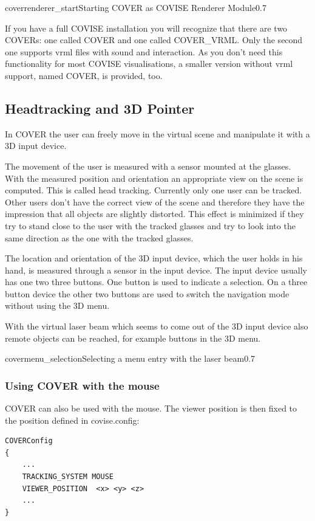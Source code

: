 \begin{covimg}{cover}{renderer_start}{Starting COVER as COVISE Renderer Module}{0.7}\end{covimg}

If you have a full COVISE installation you will recognize that there
are two COVERs: one called COVER and one called COVER\_VRML. Only the
second one supports vrml files with sound and interaction. As you don't
need this functionality for most COVISE visualisations, a smaller 
version without vrml support, named COVER, is provided, too.

\label{label_tracking_3dpointer}
\subsection{Headtracking and 3D Pointer}
In COVER the user can freely move in the virtual scene  
and manipulate it with a 3D input device.

The movement of the user is measured with a sensor 
mounted at the glasses. With the measured position and orientation an 
appropriate view on the scene is computed. This is called head tracking.
Currently only one user can be tracked. Other users don't have the correct 
view of the scene and therefore they have the impression that all objects 
are slightly distorted. This effect is minimized if they try to stand close 
to the user with the tracked glasses and try to look into the same 
direction as the one with the tracked glasses. 

The location and orientation of the 3D input device, which the user
holds in his hand, is measured through a sensor in the input device.
The input device usually has one two three buttons. One button is 
used to indicate a selection. On a three button device the other two buttons
are used to switch the navigation mode without using the 3D menu.

With the virtual laser beam which seems to come out of the 3D input device also
remote objects can be reached, for example buttons in the 3D menu.

\begin{covimg}{cover}{menu_selection}{Selecting a menu entry with the laser beam}{0.7}\end{covimg}

\subsubsection{Using COVER with the mouse}
COVER can also be used with the mouse. The viewer position is then fixed to
the position defined in covise.config:
\begin{samepage}
\begin{verbatim}
COVERConfig
{
    ...
    TRACKING_SYSTEM MOUSE
    VIEWER_POSITION  <x> <y> <z>
    ...
}
\end{verbatim}
\end{samepage}



